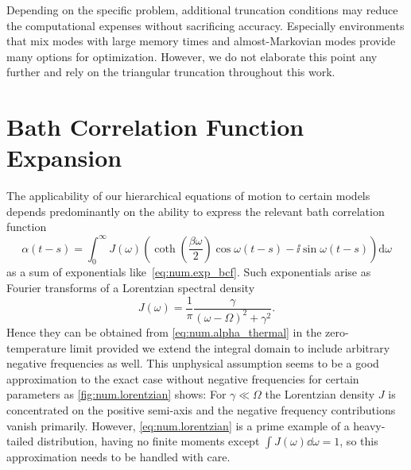 Depending on the specific problem, additional truncation conditions may reduce the computational expenses without sacrificing accuracy.
Especially environments that mix modes with large memory times and almost-Markovian modes provide many options for optimization.
However, we do not elaborate this point any further and rely on the triangular truncation throughout this work.

\section{Bath Correlation Function Expansion}
\label{sec:num.expansion}
%


The applicability of our hierarchical equations of motion to certain models depends predominantly on the ability to express the relevant bath correlation function
\begin{equation}
  \alpha(t-s) = \int_0^\infty J(\omega) \left( \coth \left( \frac{\beta \omega}{2} \right) \cos \omega(t-s) - \ii\sin \omega(t-s) \right) \mathrm{d}\omega
  \label{eq:num.alpha_thermal}
\end{equation}
as a sum of exponentials like~\ref{eq:num.exp_bcf}.
Such exponentials arise as Fourier transforms of a Lorentzian spectral density
\begin{equation}
  J(\omega) = \frac{1}{\pi} \frac{\gamma}{(\omega - \Omega)^2 + \gamma^2}.
  \label{eq:num.lorentzian}
\end{equation}
Hence they can be obtained from \autoref{eq:num.alpha_thermal} in the zero-temperature limit provided we extend the integral domain to include arbitrary negative frequencies as well.
This unphysical assumption seems to be a good approximation to the exact case without negative frequencies for certain parameters as \autoref{fig:num.lorentzian} shows:
For $\gamma\ll\Omega$ the Lorentzian density $J$ is concentrated on the positive semi-axis and the negative frequency contributions vanish primarily.
However, \autoref{eq:num.lorentzian} is a prime example of a heavy-tailed distribution, having no finite moments except $\int J(\omega) \dd \omega = 1$, so this approximation needs to be handled with care.\\



